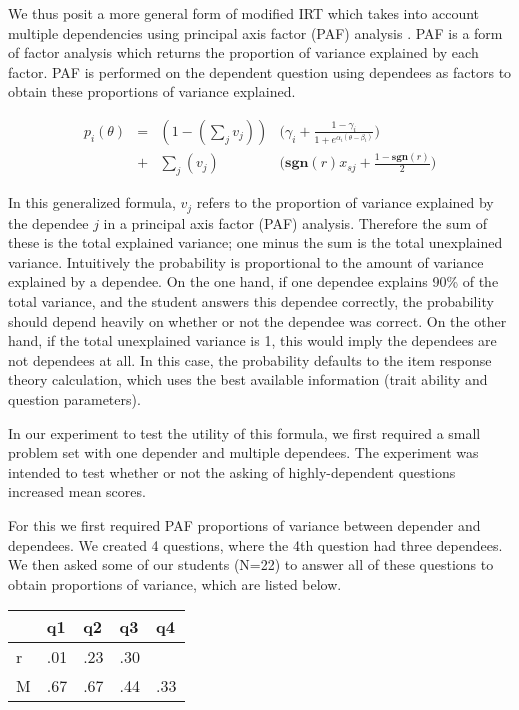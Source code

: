 \documentclass[]{interact}
\theoremstyle{plain}
\theoremstyle{definition}
\theoremstyle{remark}
\begin{document}
We thus posit a more general form of modified IRT which takes into account
multiple dependencies using principal axis factor (PAF) analysis
\citep{kim1978}.  PAF is a form of factor analysis which returns the proportion
of variance explained by each factor.  PAF is performed on the dependent
question using dependees as factors to obtain these proportions of variance
explained.

\begin{align*}
  p_i(\theta) &=& (1- (\displaystyle\sum_j v_j)) & \Big(\gamma_i + \frac{1-\gamma_i}{1+e^{\alpha_i(\theta-\beta_i)}}\Big) \\
              &+& \displaystyle\sum_j (v_j)   & \Big(\mathbf{sgn}(r)x_{sj}+\frac{1-\mathbf{sgn}(r)}{2}\Big)
\end{align*}

In this generalized formula, $v_j$ refers to the proportion of variance
explained by the dependee $j$ in a principal axis factor (PAF) analysis.
Therefore the sum of these is the total explained variance; one minus the sum
is the total unexplained variance.  Intuitively the probability is proportional
to the amount of variance explained by a dependee.  On the one hand, if one
dependee explains 90\% of the total variance, and the student answers this
dependee correctly, the probability should depend heavily on whether or not the
dependee was correct.  On the other hand, if the total unexplained variance is
1, this would imply the dependees are not dependees at all.  In this case, the
probability defaults to the item response theory calculation, which uses the
best available information (trait ability and question parameters).

In our experiment to test the utility of this formula, we first required a
small problem set with one depender and multiple dependees.  The experiment
was intended to test whether or not the asking of highly-dependent questions
increased mean scores.

For this we first required PAF proportions of variance between depender and
dependees.  We created 4 questions, where the 4th question had three dependees.
We then asked some of our students (N=22) to answer all of these questions to
obtain proportions of variance, which are listed below.  

\begin{center}
\begin{tabular}{|l|l|l|l|l|}
                                \hline
    &   q1 &  q2  & q3 & q4  \\ \hline
 r  &  .01 & .23 & .30 &     \\ \hline
 M  &  .67 & .67 & .44 & .33 \\ \hline
\end{tabular}
\end{center}
\end{document}
